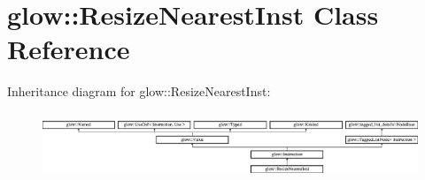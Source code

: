 \hypertarget{classglow_1_1_resize_nearest_inst}{}\section{glow\+:\+:Resize\+Nearest\+Inst Class Reference}
\label{classglow_1_1_resize_nearest_inst}
Inheritance diagram for glow\+:\+:Resize\+Nearest\+Inst\+:\begin{figure}[H]
\begin{center}
\leavevmode
\includegraphics[height=1.991111cm]{classglow_1_1_resize_nearest_inst}
\end{center}
\end{figure}
